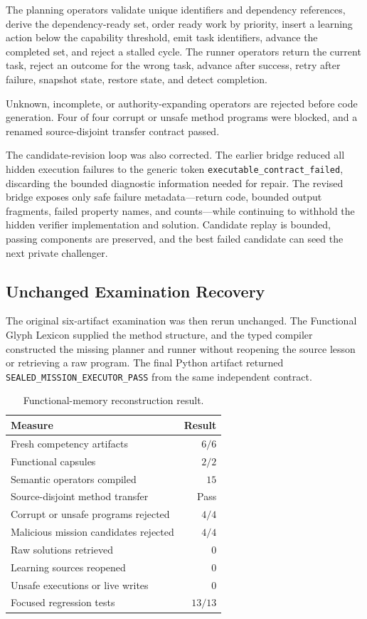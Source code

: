 The planning operators validate unique identifiers and dependency references,
derive the dependency-ready set, order ready work by priority, insert a
learning action below the capability threshold, emit task identifiers, advance
the completed set, and reject a stalled cycle.  The runner operators return the
current task, reject an outcome for the wrong task, advance after success,
retry after failure, snapshot state, restore state, and detect completion.

Unknown, incomplete, or authority-expanding operators are rejected before
code generation.  Four of four corrupt or unsafe method programs were blocked,
and a renamed source-disjoint transfer contract passed.

The candidate-revision loop was also corrected.  The earlier bridge reduced
all hidden execution failures to the generic token
\texttt{executable\_contract\_failed}, discarding the bounded diagnostic
information needed for repair.  The revised bridge exposes only safe failure
metadata---return code, bounded output fragments, failed property names, and
counts---while continuing to withhold the hidden verifier implementation and
solution.  Candidate replay is bounded, passing components are preserved, and
the best failed candidate can seed the next private challenger.

\subsection{Unchanged Examination Recovery}

The original six-artifact examination was then rerun unchanged.  The
Functional Glyph Lexicon supplied the method structure, and the typed compiler
constructed the missing planner and runner without reopening the source lesson
or retrieving a raw program.  The final Python artifact returned
\texttt{SEALED\_MISSION\_EXECUTOR\_PASS} from the same independent contract.

\begin{table}[htbp]
\centering
\caption{Functional-memory reconstruction result.}
\label{tab:functional-memory-reconstruction}
\begin{tabular}{lr}
\hline
\textbf{Measure} & \textbf{Result} \\
\hline
Fresh competency artifacts & $6/6$ \\
Functional capsules & $2/2$ \\
Semantic operators compiled & $15$ \\
Source-disjoint method transfer & Pass \\
Corrupt or unsafe programs rejected & $4/4$ \\
Malicious mission candidates rejected & $4/4$ \\
Raw solutions retrieved & $0$ \\
Learning sources reopened & $0$ \\
Unsafe executions or live writes & $0$ \\
Focused regression tests & $13/13$ \\
\hline
\end{tabular}
\end{table}

